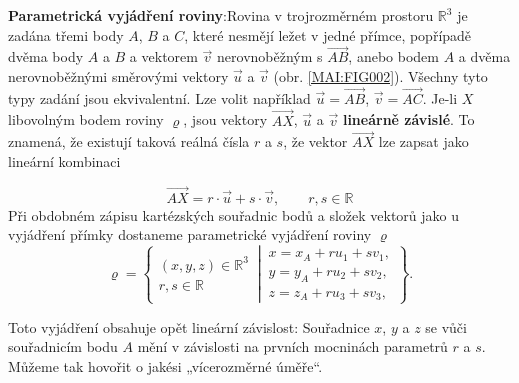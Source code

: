 \begin{mdframed}[style=mdexam]
  \begin{example}\label{mai:exam004}
    \textbf{Parametrická vyjádření roviny}:\newline Rovina v trojrozměrném prostoru \(\mathbb{R}^3\)
    je zadána třemi body \(A\), \(B\) a \(C\), které nesmějí ležet v jedné přímce, popřípadě dvěma
    body \(A\) a \(B\) a vektorem \(\vec{v}\) nerovnoběžným s \(\overrightarrow{AB}\), anebo bodem
    \(A\) a dvěma nerovnoběžnými směrovými vektory \(\vec{u}\) a \(\vec{v}\) (obr.
    \ref{MAI:FIG002}). Všechny tyto typy zadání jsou ekvivalentní. Lze volit například \(\vec{u} =
    \overrightarrow{AB}\), \(\vec{v} = \overrightarrow{AC}\). Je-li \(X\) libovolným bodem roviny
    \(\varrho\), jsou vektory \(\overrightarrow{AX}\), \(\vec{u}\) a \(\vec{v}\) \textbf{lineárně
    závislé}. To znamená, že existují taková reálná čísla \(r\) a \(s\), že vektor
    \(\overrightarrow{AX}\) lze zapsat jako lineární kombinaci

    \begin{equation*}
      \overrightarrow{AX} = r\cdot\vec{u} + s\cdot\vec{v}, \qquad r,s \in\mathbb{R}
    \end{equation*}
    Při obdobném zápisu kartézských souřadnic bodů a složek vektorů jako u vyjádření přímky
    dostaneme parametrické vyjádření roviny \(\varrho\)
    \begin{equation*}
      \varrho = \left\{
      \begin{matrix}  
        (x,y,z)\in\mathbb{R}^3  \\
        r, s \in\mathbb{R}
      \end{matrix}
      \,\left\lvert\,
      \begin{matrix}
        x = x_A + ru_1 + sv_1,        \\
        y = y_A + ru_2 + sv_2,        \\
        z = z_A + ru_3 + sv_3,
      \end{matrix}\right.          
      \right\}.
    \end{equation*}

    { \centering
      \captionsetup{type=figure}
    \par}

    Toto vyjádření obsahuje opět lineární závislost: Souřadnice \(x\), \(y\) a \(z\) se vůči
    souřadnicím bodu \(A\) mění v závislosti na prvních mocninách parametrů \(r\) a \(s\). Můžeme
    tak hovořit o jakési „vícerozměrné úměře“.
  \end{example}
\end{mdframed}
  